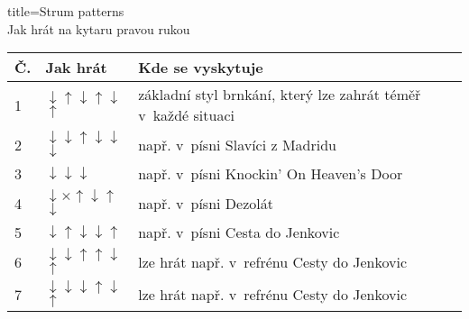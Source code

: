 \begin{song}{title=\centering Strum patterns \\\normalsize Jak hrát na kytaru pravou rukou \vspace*{-0.3cm}}  %

\newcommand{\up}{$\uparrow$} %
\newcommand{\dn}{$\downarrow$} %
\newcommand{\x}{$\times$} %
\newcommand{\tu}{\textunderscore} %
\centering
\mezera 

\renewcommand{\arraystretch}{1.4}
\begin{tabular}{l  l  l}
\hline\hline 
Č. & Jak hrát & Kde se vyskytuje  \\ \hline
1  & \dn \up \dn \up \dn \up & základní styl brnkání, který lze zahrát téměř v~každé situaci\\
2  & \dn \tu \dn \up \tu  \dn \tu \dn \tu \dn & např. v~písni Slavíci z Madridu  \\
3  & \dn \tu \tu \tu \dn \tu \dn & např. v~písni Knockin' On Heaven's Door  \\
4  & \dn \x  \up \dn \up \dn & např. v~písni Dezolát \\
5  & \dn \up \dn \tu \dn \up & např. v~písni Cesta do Jenkovic \\
6  & \dn \tu \dn \up \tu \up \dn \up & lze hrát např. v~refrénu Cesty do Jenkovic \\
7  & \dn \tu \dn \tu \dn \up \dn \up & lze hrát např. v~refrénu Cesty do Jenkovic \\
\hline \hline
\end{tabular}



	
\setcounter{Slokočet}{0}
\end{song}


